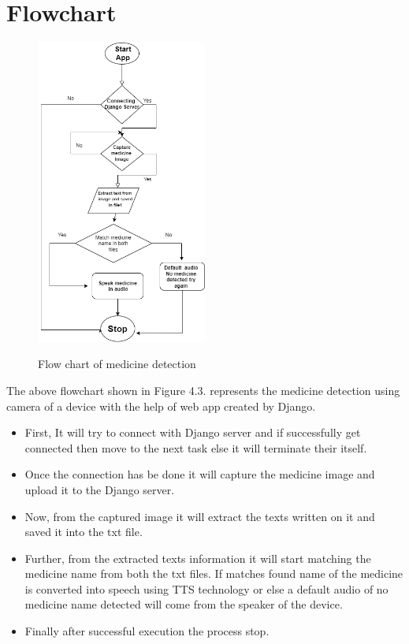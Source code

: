 \section{Flowchart}
\begin{figure}[h!]
   \centering
    \includegraphics[width=0.5\textwidth]{CHAPTERS/c33.PNG}\\
    \caption {Flow chart of medicine detection}
\end{figure}
\newpage
\noindent The above flowchart shown in Figure 4.3. represents the medicine detection using
camera of a device with the help of web app created by Django. 
\begin{itemize}
	\item First, It will try to connect with Django server and if successfully get connected then move to the next task else it will terminate their itself.
	\item Once the connection has be done it will capture the medicine image and upload it to the Django server.
	\item Now, from the captured image it will extract the texts written on it and saved it into the txt file.
	\item Further, from the extracted texts information it will start matching the medicine name from both the txt files. If matches found name of the medicine is converted into speech using TTS technology or else a default audio of no medicine name detected will come from the speaker of the device.
	\item Finally after successful execution the process stop.
\end{itemize}
